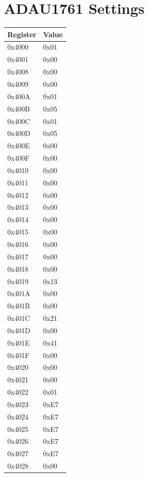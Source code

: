 \chapter{ADAU1761 Settings}
\label{sec:appAdauSettings}
\begin{table}[!htb]
	\footnotesize
    \begin{subtable}{.5\linewidth}
      \centering
        \begin{tabular}{l|l}
			Register & Value \\
			\hline
			\hline
			0x4000 & 0x01 \\
			0x4001 & 0x00 \\
			0x4008 & 0x00 \\
			0x4009 & 0x00 \\
			0x400A & 0x01 \\
			0x400B & 0x05 \\
			0x400C & 0x01 \\
			0x400D & 0x05 \\
			0x400E & 0x00 \\
			0x400F & 0x00 \\
			0x4010 & 0x00 \\
			0x4011 & 0x00 \\
			0x4012 & 0x00 \\
			0x4013 & 0x00 \\
			0x4014 & 0x00 \\
			0x4015 & 0x00 \\
			0x4016 & 0x00 \\
			0x4017 & 0x00 \\
			0x4018 & 0x00 \\
			0x4019 & 0x13 \\
			0x401A & 0x00 \\
			0x401B & 0x00 \\
			0x401C & 0x21 \\
			0x401D & 0x00 \\
			0x401E & 0x41 \\
			0x401F & 0x00 \\
			0x4020 & 0x00 \\
			0x4021 & 0x00 \\
			0x4022 & 0x01 \\
			0x4023 & 0xE7 \\
			0x4024 & 0xE7 \\
			0x4025 & 0xE7 \\
			0x4026 & 0xE7 \\
			0x4027 & 0xE7 \\
			0x4028 & 0x00 \\

\end{tabular}
\end{subtable}
\end{table}
